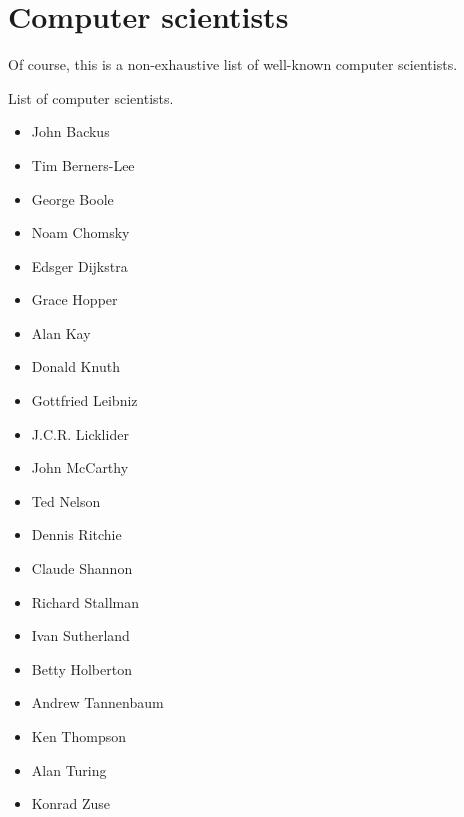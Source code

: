 \section{Computer scientists}
%
Of course, this is a non-exhaustive list of well-known computer scientists.

List of computer scientists.

\begin{itemize}
  \item John Backus
  \item Tim Berners-Lee
  \item George Boole
  \item Noam Chomsky
  \item Edsger Dijkstra
  \item Grace Hopper
  \item Alan Kay
  \item Donald Knuth
  \item Gottfried Leibniz
  \item J.C.R. Licklider
  \item John McCarthy
  \item Ted Nelson
  \item Dennis Ritchie
  \item Claude Shannon
  \item Richard Stallman
  \item Ivan Sutherland
  \item Betty Holberton
  \item Andrew Tannenbaum
  \item Ken Thompson
  \item Alan Turing
  \item Konrad Zuse
\end{itemize}
